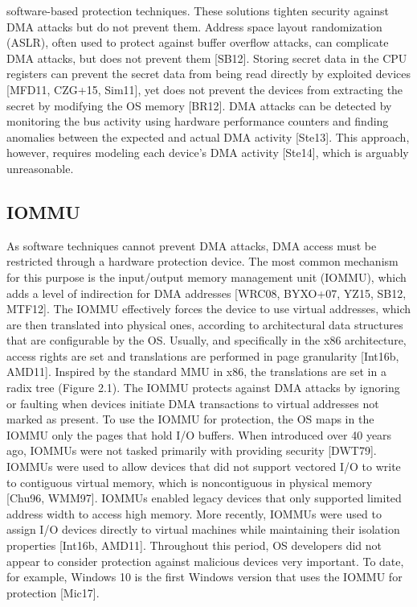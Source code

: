 software-based protection techniques. These solutions tighten security against DMA attacks but do not prevent them. Address space layout randomization (ASLR), often used to protect against buffer overflow attacks, can complicate DMA attacks, but does not prevent them [SB12]. Storing secret data in the CPU registers can prevent the secret data from being read directly by exploited devices [MFD11, CZG+15, Sim11], yet does not prevent the devices from extracting the secret by modifying the OS memory [BR12]. DMA attacks can be detected by monitoring the bus activity using hardware performance counters and finding anomalies between the expected and actual DMA activity [Ste13]. This approach, however, requires modeling each device’s DMA activity [Ste14], which is arguably unreasonable.
\subsection{IOMMU}
As software techniques cannot prevent DMA attacks, DMA access must be restricted through a hardware protection device. The most common mechanism for this purpose is the input/output memory management unit (IOMMU), which adds a level of indirection for DMA addresses [WRC08, BYXO+07, YZ15, SB12, MTF12]. The IOMMU effectively forces the device to use virtual addresses, which are then translated into physical ones, according to architectural data structures that are configurable by the OS. Usually, and specifically in the x86 architecture, access rights are set and translations are performed in page granularity [Int16b, AMD11]. Inspired by the standard MMU in x86, the translations are set in a radix tree (Figure 2.1). The IOMMU protects against DMA attacks by ignoring or faulting when devices initiate DMA transactions to virtual addresses not marked as present. To use the IOMMU for protection, the OS maps in the IOMMU only the pages that hold I/O buffers. When introduced over 40 years ago, IOMMUs were not tasked primarily with providing security [DWT79]. IOMMUs were used to allow devices that did not support vectored I/O to write to contiguous virtual memory, which is noncontiguous in physical memory [Chu96, WMM97]. IOMMUs enabled legacy devices that only supported limited address width to access high memory. More recently, IOMMUs were used to assign I/O devices directly to virtual machines while maintaining their isolation properties [Int16b, AMD11]. Throughout this period, OS developers did not appear to consider protection against malicious devices very important. To date, for example, Windows 10 is the first Windows version that uses the IOMMU for protection [Mic17].

